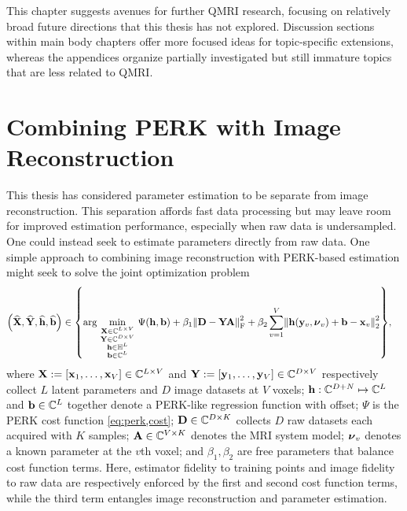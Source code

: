 
This chapter suggests avenues
for further QMRI research,
focusing on relatively broad future directions
that this thesis has not explored.
Discussion sections
within main body chapters
offer more focused ideas 
for topic-specific extensions,
whereas the appendices organize 
partially investigated but still immature topics
that are less related to QMRI.

\section{Combining PERK with Image Reconstruction}
\label{s,future,recon}

This thesis has considered parameter estimation
to be separate from image reconstruction.
This separation affords fast data processing
but may leave room for improved estimation performance,
especially when raw data is undersampled.
One could instead seek 
to estimate parameters 
directly from raw data.
One simple approach 
to combining image reconstruction
with PERK-based estimation
might seek to solve
the joint optimization problem
\begin{align}
	\paren{\est{\bmX},\est{\bmY},\est{\bmh},\est{\bmb}} &\in \set{%
		\argmin{%
			\substack{%
				\bmX \in \complexes{L \times V} \\
				\bmY \in \complexes{D \times V} \\
				\bmh \in \hilb^L \\
				\bmb \in \complexes{L}
			}%
		}%
		\costa{\bmh,\bmb} 
			+ \beta_1 \frob{\bmD-\bmY\bmA}^2 
			+ \beta_2 \sum_{v=1}^V \norm{\bmh\paren{\bmy_v,\bmnu_v}+\bmb-\bmx_v}^2_2
	},
	\label{eq:future,recon}
\end{align}
where 
$\bmX := \brac{\bmx_1,\dots,\bmx_V} \in \complexes{L \times V}$
and
$\bmY := \brac{\bmy_1,\dots,\bmy_V} \in \complexes{D \times V}$
respectively collect $L$ latent parameters 
and $D$ image datasets 
at $V$ voxels;
$\mathbf{h} : \mathbb{C}^{D+N} \mapsto \mathbb{C}^{L}$ 
and $\mathbf{b} \in \mathbb{C}^{L}$ 
together denote a PERK-like regression function with offset;
$\Psi$ is the PERK cost function \eqref{eq:perk,cost};
$\mathbf{D} \in \mathbb{C}^{D \times K}$
collects $D$ raw datasets 
each acquired with $K$ samples;
$\mathbf{A} \in \mathbb{C}^{V \times K}$ 
denotes the MRI system model;
$\boldsymbol{\nu}_v$ denotes a known parameter at the $v$th voxel;
and $\beta_1,\beta_2$ are free parameters
that balance cost function terms.
Here, 
estimator fidelity to training points
and image fidelity to raw data
are respectively enforced 
by the first and second cost function terms,
while the third term entangles image reconstruction
and parameter estimation.


